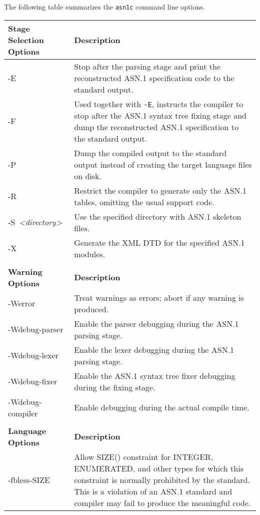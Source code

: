 \documentclass[english,oneside,12pt]{book}
\newcommand{\cmd}[1]{\texttt{#1}}
\begin{document}
The following table summarizes the \cmd{asn1c} command line options.

\renewcommand{\arraystretch}{1.33}
\begin{longtable}{lp{4in}}
\textbf{Stage Selection Options} & \textbf{Description}\\
\midrule
{\ttfamily -E} & {\small Stop after the parsing stage and print the reconstructed ASN.1
specification code to the standard output.}\\
{\ttfamily -F} & {\small Used together with \texttt{-E}, instructs the compiler to stop after
the ASN.1 syntax tree fixing stage and dump the reconstructed ASN.1
specification to the standard output.}\\
{\ttfamily -P} & {\small Dump the compiled output to the standard output instead of
creating the target language files on disk.}\\
{\ttfamily -R} & {\small Restrict the compiler to generate only the ASN.1 tables, omitting the usual support code.}\\
{\ttfamily -S~\emph{<directory>}} & {\small Use the specified directory with ASN.1 skeleton files.}\\
{\ttfamily -X} & {\small Generate the XML DTD for the specified ASN.1 modules.}\\\\
\textbf{Warning Options} & \textbf{Description}\\
\midrule
{\ttfamily -Werror} & {\small Treat warnings as errors; abort if any warning is produced.}\\
{\ttfamily -Wdebug-parser} & {\small Enable the parser debugging during the ASN.1 parsing stage.}\\
{\ttfamily -Wdebug-lexer} & {\small Enable the lexer debugging during the ASN.1 parsing stage.}\\
{\ttfamily -Wdebug-fixer} & {\small Enable the ASN.1 syntax tree fixer debugging during the fixing stage.}\\
{\ttfamily -Wdebug-compiler} & {\small Enable debugging during the actual compile time.}\\  \\
\textbf{Language Options} & \textbf{Description}\\
\midrule
{\ttfamily -fbless-SIZE} & {\small Allow SIZE() constraint for INTEGER, ENUMERATED, and other types for which this constraint is normally prohibited by the standard.
This is a violation of an ASN.1 standard and compiler may fail to produce the meaningful code.}\\

\end{longtable}
\end{document}
